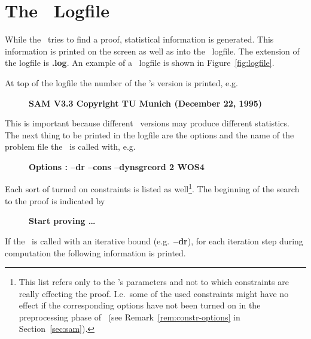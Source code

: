 %
\section{The \SAM\ Logfile}\label{sec:logfile}

While the \SAM\ tries to find a proof, statistical information
is generated. This information is printed on the screen as well as into
the \SAM\ logfile. The extension of the logfile is {\bf .log}. An
example of a \SAM\ logfile is shown in Figure~\ref{fig:logfile}. 


At top of the logfile the number of the \SAM's version is
printed, e.g.\ 
\begin{description}
\item [\phantom{1234}] 
      {\bf SAM V3.3 Copyright TU Munich (December 22, 1995)}
\end{description}
This is important because different \SAM\ versions may produce
different statistics. 
The next thing to be printed in the logfile are the options and the
name of the problem file the \SAM\ is called with, e.g.\ 
\begin{description}
\item [\phantom{1234}] 
      {\bf Options : --dr --cons --dynsgreord 2 WOS4}
\end{description} 
Each sort of turned on constraints is listed as well\footnote{This
list refers only to the \SAM's parameters and not to which constraints
are really effecting the proof. I.e.\ some of the used constraints
might have no effect if the corresponding options have not been turned
on in the preprocessing phase of \inw\ (see
Remark~\ref{rem:constr-options} in Section~\ref{sec:sam}).}.  
The beginning of the search to the proof is indicated by 
\begin{description}
\item [\phantom{1234}] 
      {\bf Start proving \dots}
\end{description} 
If the \SAM\ is called with an iterative bound (e.g.\ {\bf --dr}), for
each iteration step during computation the following information is
printed. 
